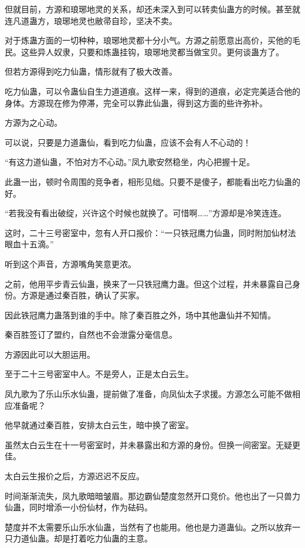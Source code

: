 
\begin{this_body}

但就目前，方源和琅琊地灵的关系，却还未深入到可以转卖仙蛊方的时候。甚至就连凡道蛊方，琅琊地灵也敝帚自珍，坚决不卖。

对于炼蛊方面的一切种种，琅琊地灵都十分小气。方源之前愿意出高价，买他的毛民。这些异人奴隶，只要和炼蛊挂钩，琅琊地灵都当做宝贝。更何谈蛊方了。

但若方源得到吃力仙蛊，情形就有了极大改善。

吃力仙蛊，可以令蛊仙自生力道道痕。这样一来，得到的道痕，必定完美适合他的身体。方源现在修为停滞，完全可以靠此仙蛊，得到这方面的些许弥补。

方源为之心动。

可以说，只要是力道蛊仙，看到吃力仙蛊，应该不会有人不心动的！

“有这力道仙蛊，不怕对方不心动。”凤九歌安然稳坐，内心把握十足。

此蛊一出，顿时令周围的竞争者，相形见绌。只要不是傻子，都能看出吃力仙蛊的好。

“若我没有看出破绽，兴许这个时候也就换了。可惜啊……”方源却是冷笑连连。

这时，二十三号密室中，忽有人开口报价：“一只铁冠鹰力仙蛊，同时附加仙材法眼血十五滴。”

听到这个声音，方源嘴角笑意更浓。

之前，他用平步青云仙蛊，换来了一只铁冠鹰力蛊。但这个过程，并未暴露自己身份。方源是通过秦百胜，确认了买家。

因此铁冠鹰力蛊落到谁的手中。除了秦百胜之外，场中其他蛊仙并不知情。

秦百胜签订了盟约，自然也不会泄露分毫信息。

方源因此可以大胆运用。

至于二十三号密室中人。不是旁人，正是太白云生。

凤九歌为了乐山乐水仙蛊，提前做了准备，向凤仙太子求援。方源怎么可能不做相应准备呢？

他早就通过秦百胜，安排太白云生，暗中换了密室。

虽然太白云生在十一号密室时，并未暴露出和方源的身份。但换一间密室。无疑更佳。

太白云生报价之后，方源迟迟不反应。

时间渐渐流失，凤九歌暗暗皱眉。那边霸仙楚度忽然开口竞价。他也出了一只兽力仙蛊，同时增添一小份仙材，作为砝码。

楚度并不太需要乐山乐水仙蛊，当然有了也能用。他也是力道蛊仙。之所以放弃一只力道仙蛊。却是打着吃力仙蛊的主意。


\end{this_body}
